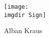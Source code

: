 \begin{flushleft}
  \ifprinted
  \else
    \texttt{[image: \\imgdir Sign]}\par
  \fi
  Alban Kraus
\end{flushleft}